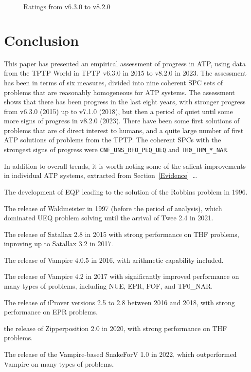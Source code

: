 \documentclass[runningheads]{llncs}
\newenvironment{packed_itemize}{
\vspace*{-0.5em}
\begin{itemize}
\setlength{\partopsep}{0pt}
\setlength{\itemsep}{1pt}
\setlength{\parskip}{0pt}
\setlength{\parsep}{0pt}
}{\end{itemize}}
\begin{document}
\begin{figure}[t!]
\begin{minipage}[t]{.49\textwidth}
  \vspace*{-2em}
  \caption{Ratings from v6.3.0 to v8.2.0}
  \label{Ratings_v6.3.0_v8.2.0}
\end{minipage}
\end{figure}

\section{Conclusion}
\label{Conclusion}

This paper has presented an empirical assessment of progress in ATP, using data from the TPTP
World in TPTP v6.3.0 in 2015 to v8.2.0 in 2023.
The assessment has been in terms of six measures, divided into nine coherent SPC sets of problems
that are reasonably homogeneous for ATP systems.
The assessment shows that there has been progress in the last eight years, with stronger progress 
from v6.3.0 (2015) up to v7.1.0 (2018), but then a period of quiet until some more signs of 
progress in v8.2.0 (2023).
There have been some first solutions of problems that are of direct interest to humans, and
a quite large number of first ATP solutions of problems from the TPTP.
The coherent SPCs with the strongest signs of progress were {\tt CNF\_UNS\_RFO\_PEQ\_UEQ} and
{\tt TH0\_THM\_*\_NAR}.

In addition to overall trends, it is worth noting some of the salient improvements in individual 
ATP systems, extracted from Section~\ref{Evidence}~\ldots
\begin{packed_itemize}
\item The development of EQP leading to the solution of the Robbins problem in 1996.
\item The release of Waldmeister in 1997 (before the period of analysis), which dominated UEQ 
      problem solving until the arrival of Twee 2.4 in 2021.
\item The release of Satallax 2.8 in 2015 with strong performance on THF problems, inproving
      up to Satallax 3.2 in 2017.
\item The release of Vampire 4.0.5 in 2016, with arithmetic capability included.
\item The release of Vampire 4.2 in 2017 with significantly improved performance on many types 
      of problems, including NUE, EPR, FOF, and TF0\_NAR.
\item The release of iProver versions 2.5 to 2.8 between 2016 and 2018, with strong performance 
      on EPR problems.
\item the release of Zipperposition 2.0 in 2020, with strong performance on THF problems.
\item The release of the Vampire-based SnakeForV 1.0 in 2022, which outperformed Vampire on
      many types of problems.
\end{packed_itemize}
\end{document}
